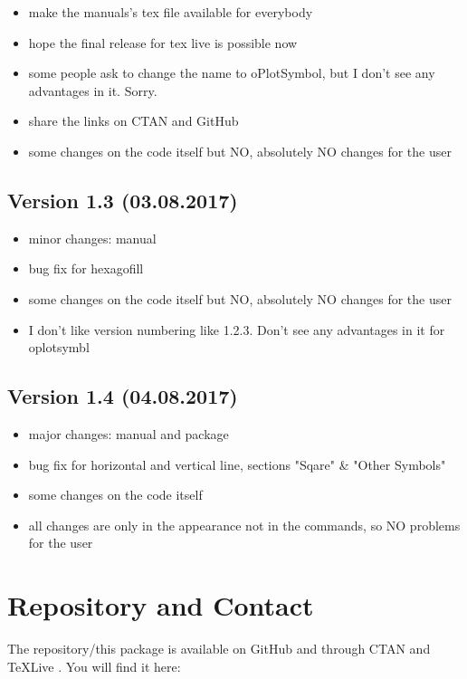 \documentclass[
	a4paper,
	parskip=half,
    pagesize=auto,      		%
    listof=totoc,   		%
    bibliography=totoc,
	11pt
]{scrartcl}
\begin{document}
\begin{itemize}
    \item make the manuals's tex file available for everybody
    \item hope the final release for tex live is possible now
    \item some people ask to change the name to oPlotSymbol, but I don't see any advantages in it. Sorry.
    \item share the links on CTAN and GitHub
    \item some changes on the code itself but NO, absolutely NO changes for the user 
\end{itemize}


\subsection{Version 1.3 (03.08.2017)}

\begin{itemize}
    \item minor changes: manual
    \item bug fix for hexagofill
    \item some changes on the code itself but NO, absolutely NO changes for the user 
    \item I don't like version numbering like 1.2.3. Don't see any advantages in it for oplotsymbl
\end{itemize}


\subsection{Version 1.4 (04.08.2017)}

\begin{itemize}
    \item major changes: manual and package
    \item bug fix for horizontal and vertical line, sections "Sqare" \& "Other Symbols"
    \item some changes on the code itself 
    \item all changes are only in the appearance not in the commands, so NO problems for the user 
\end{itemize}


\section{Repository and Contact}

The repository/this package is available on GitHub and through CTAN \cite{ctan} and TeXLive \cite{texlive}. You will find it here:
\end{document}
